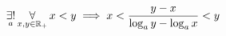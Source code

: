 \documentclass{article}
\begin{document}
\[
\operatornamewithlimits{\exists!}_a
\operatornamewithlimits\forall_{x,y \in \mathbb R _+}
x<y \implies
x<
\frac
{y-x}
{\log_a y - \log_a x}
<y
\]
\end{document}
